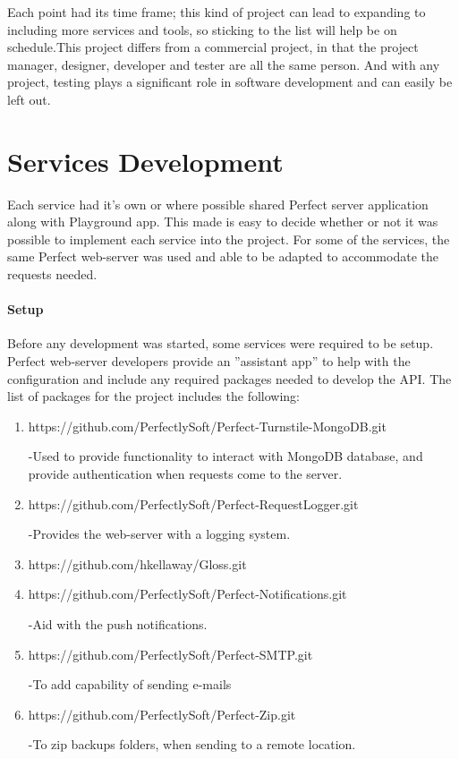 Each point had its time frame; this kind of project can lead to expanding to including more services and tools, so sticking to the list will help be on schedule.This project differs from a commercial project, in that the project manager, designer, developer and tester are all the same person. And with any project, testing plays a significant role in software development and can easily be left out.

\section{Services Development}

Each service had it's own or where possible shared Perfect server application along with Playground app. This made is easy to decide whether or not it was possible to implement each service into the project. For some of the services, the same Perfect web-server was used and able to be adapted to accommodate the requests needed. 

\paragraph{Setup} 

Before any development was started, some services were required to be setup. Perfect web-server developers provide an ”assistant app” to help with the configuration and include any required packages needed to develop the API. The list of packages for the project includes the following:

\begin{enumerate}
  \item https://github.com/PerfectlySoft/Perfect-Turnstile-MongoDB.git
  
  -Used to provide functionality to interact with MongoDB database, and provide authentication when requests come to the server.
  \item https://github.com/PerfectlySoft/Perfect-RequestLogger.git
  
  -Provides the web-server with a logging system.
  \item https://github.com/hkellaway/Gloss.git
  \item https://github.com/PerfectlySoft/Perfect-Notifications.git
  
  -Aid with the push notifications.
  \item https://github.com/PerfectlySoft/Perfect-SMTP.git
  
  -To add capability of sending e-mails
  \item https://github.com/PerfectlySoft/Perfect-Zip.git
  
  -To zip backups folders, when sending to a remote location.
\end{enumerate}

